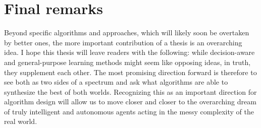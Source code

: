 \section{Final remarks}

Beyond specific algorithms and approaches, which will likely soon be overtaken by better ones, the more important contribution of a thesis is an overarching idea.
I hope this thesis will leave readers with the following: while decision-aware and general-purpose learning methods might seem like opposing ideas, in truth, they supplement each other.
The most promising direction forward is therefore to see both as two sides of a spectrum and ask what algorithms are able to synthesize the best of both worlds.
Recognizing this as an important direction for algorithm design will allow us to move closer and closer to the overarching dream of truly intelligent and autonomous agents acting in the messy complexity of the real world.
